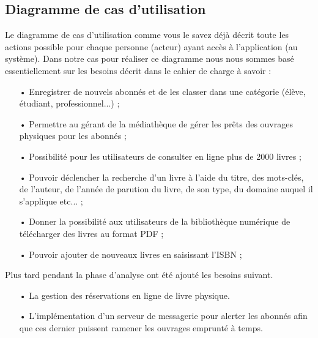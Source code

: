 \documentclass[12pt,a4paper]{article}
\begin{document}
\subsection{Diagramme de cas d'utilisation}
Le diagramme de cas d'utilisation comme vous le savez déjà décrit toute les actions
possible pour chaque personne (acteur) ayant accès à l'application (au système). Dans 
notre cas pour réaliser ce diagramme nous nous sommes basé essentiellement sur les besoins décrit dans le cahier de charge à savoir : 
\begin{itemize} 
\item[•] Enregistrer de nouvels abonnés et de les classer dans une catégorie (élève, étudiant, professionnel...) ;
\item[•] Permettre au gérant de la médiathèque de gérer les prêts des ouvrages physiques pour les abonnés ;
\item[•] Possibilité pour les utilisateurs de consulter en ligne plus de 2000 livres ;
\item[•] Pouvoir déclencher la recherche d’un livre à l’aide du titre, des mots-clés, de l’auteur, de l’année
de parution du livre, de son type, du domaine auquel il s’applique etc... ;
\item[•] Donner la possibilité aux utilisateurs de la bibliothèque numérique de télécharger des livres au
format PDF ;
\item[•] Pouvoir ajouter de nouveaux livres en saisissant l’ISBN ;
\end{itemize}
Plus tard pendant la phase d'analyse ont été ajouté les besoins suivant.\\
\begin{itemize}
\item[•] La gestion des réservations en ligne de livre physique.
\item[•] L'implémentation d'un serveur de messagerie pour alerter les abonnés afin
que ces dernier puissent ramener les ouvrages emprunté à temps.
\end{itemize}
\end{document}
